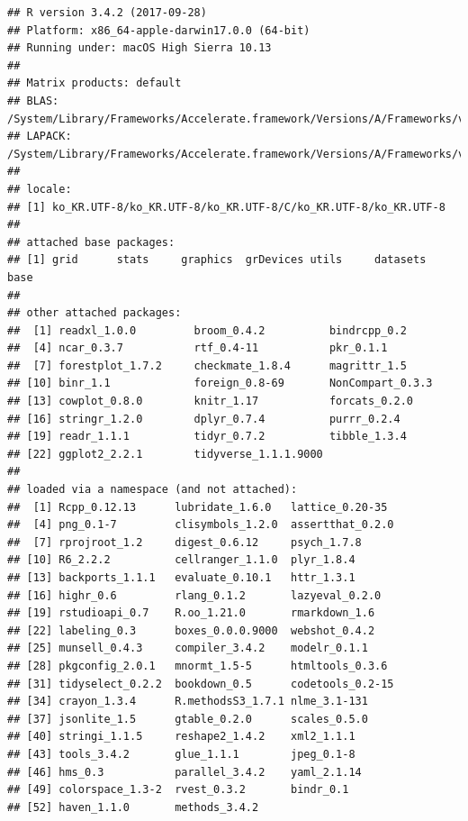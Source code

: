 \documentclass[12pt,]{krantz}
\theoremstyle{definition}
\theoremstyle{definition}
\theoremstyle{definition}
\theoremstyle{remark}
\begin{document}
\begin{verbatim}
## R version 3.4.2 (2017-09-28)
## Platform: x86_64-apple-darwin17.0.0 (64-bit)
## Running under: macOS High Sierra 10.13
## 
## Matrix products: default
## BLAS: /System/Library/Frameworks/Accelerate.framework/Versions/A/Frameworks/vecLib.framework/Versions/A/libBLAS.dylib
## LAPACK: /System/Library/Frameworks/Accelerate.framework/Versions/A/Frameworks/vecLib.framework/Versions/A/libLAPACK.dylib
## 
## locale:
## [1] ko_KR.UTF-8/ko_KR.UTF-8/ko_KR.UTF-8/C/ko_KR.UTF-8/ko_KR.UTF-8
## 
## attached base packages:
## [1] grid      stats     graphics  grDevices utils     datasets  base     
## 
## other attached packages:
##  [1] readxl_1.0.0         broom_0.4.2          bindrcpp_0.2        
##  [4] ncar_0.3.7           rtf_0.4-11           pkr_0.1.1           
##  [7] forestplot_1.7.2     checkmate_1.8.4      magrittr_1.5        
## [10] binr_1.1             foreign_0.8-69       NonCompart_0.3.3    
## [13] cowplot_0.8.0        knitr_1.17           forcats_0.2.0       
## [16] stringr_1.2.0        dplyr_0.7.4          purrr_0.2.4         
## [19] readr_1.1.1          tidyr_0.7.2          tibble_1.3.4        
## [22] ggplot2_2.2.1        tidyverse_1.1.1.9000
## 
## loaded via a namespace (and not attached):
##  [1] Rcpp_0.12.13      lubridate_1.6.0   lattice_0.20-35  
##  [4] png_0.1-7         clisymbols_1.2.0  assertthat_0.2.0 
##  [7] rprojroot_1.2     digest_0.6.12     psych_1.7.8      
## [10] R6_2.2.2          cellranger_1.1.0  plyr_1.8.4       
## [13] backports_1.1.1   evaluate_0.10.1   httr_1.3.1       
## [16] highr_0.6         rlang_0.1.2       lazyeval_0.2.0   
## [19] rstudioapi_0.7    R.oo_1.21.0       rmarkdown_1.6    
## [22] labeling_0.3      boxes_0.0.0.9000  webshot_0.4.2    
## [25] munsell_0.4.3     compiler_3.4.2    modelr_0.1.1     
## [28] pkgconfig_2.0.1   mnormt_1.5-5      htmltools_0.3.6  
## [31] tidyselect_0.2.2  bookdown_0.5      codetools_0.2-15 
## [34] crayon_1.3.4      R.methodsS3_1.7.1 nlme_3.1-131     
## [37] jsonlite_1.5      gtable_0.2.0      scales_0.5.0     
## [40] stringi_1.1.5     reshape2_1.4.2    xml2_1.1.1       
## [43] tools_3.4.2       glue_1.1.1        jpeg_0.1-8       
## [46] hms_0.3           parallel_3.4.2    yaml_2.1.14      
## [49] colorspace_1.3-2  rvest_0.3.2       bindr_0.1        
## [52] haven_1.1.0       methods_3.4.2
\end{verbatim}
\end{document}
